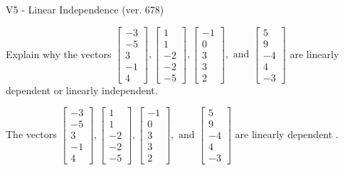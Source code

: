 \begin{exercise}
  \begin{exerciseTitle}V5 - Linear Independence (ver. 678)\end{exerciseTitle}
  \begin{exerciseStatement}
    Explain why the vectors \(\left[\begin{array}{r}
-3 \\
-5 \\
3 \\
-1 \\
4
\end{array}\right] , \left[\begin{array}{r}
1 \\
1 \\
-2 \\
-2 \\
-5
\end{array}\right] , \left[\begin{array}{r}
-1 \\
0 \\
3 \\
3 \\
2
\end{array}\right] , \text{ and } \left[\begin{array}{r}
5 \\
9 \\
-4 \\
4 \\
-3
\end{array}\right]\) are linearly dependent or linearly independent.	


  \end{exerciseStatement}
  \begin{exerciseAnswer}
   The vectors \(\left[\begin{array}{r}
-3 \\
-5 \\
3 \\
-1 \\
4
\end{array}\right] , \left[\begin{array}{r}
1 \\
1 \\
-2 \\
-2 \\
-5
\end{array}\right] , \left[\begin{array}{r}
-1 \\
0 \\
3 \\
3 \\
2
\end{array}\right] , \text{ and } \left[\begin{array}{r}
5 \\
9 \\
-4 \\
4 \\
-3
\end{array}\right]\) are 
  	 linearly dependent  .
  


  \end{exerciseAnswer}
\end{exercise}